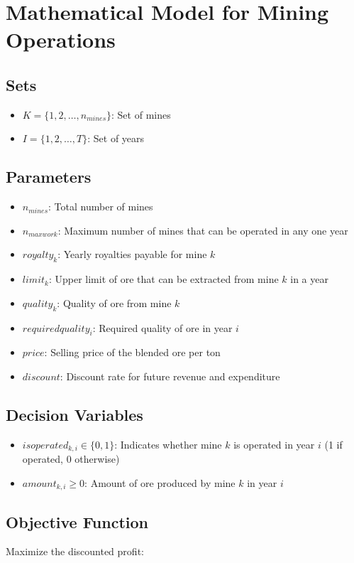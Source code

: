\documentclass{article}
\begin{document}
\section*{Mathematical Model for Mining Operations}

\subsection*{Sets}
\begin{itemize}
    \item $K = \{1, 2, \ldots, n_{mines}\}$: Set of mines
    \item $I = \{1, 2, \ldots, T\}$: Set of years
\end{itemize}

\subsection*{Parameters}
\begin{itemize}
    \item $n_{mines}$: Total number of mines
    \item $n_{maxwork}$: Maximum number of mines that can be operated in any one year
    \item $royalty_k$: Yearly royalties payable for mine $k$
    \item $limit_k$: Upper limit of ore that can be extracted from mine $k$ in a year
    \item $quality_k$: Quality of ore from mine $k$
    \item $requiredquality_i$: Required quality of ore in year $i$
    \item $price$: Selling price of the blended ore per ton
    \item $discount$: Discount rate for future revenue and expenditure
\end{itemize}

\subsection*{Decision Variables}
\begin{itemize}
    \item $isoperated_{k,i} \in \{0,1\}$: Indicates whether mine $k$ is operated in year $i$ (1 if operated, 0 otherwise)
    \item $amount_{k,i} \geq 0$: Amount of ore produced by mine $k$ in year $i$
\end{itemize}

\subsection*{Objective Function}
Maximize the discounted profit:
\end{document}
